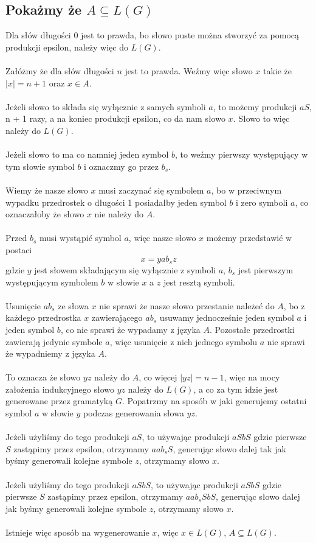 \documentclass{article}
\begin{document}
\subsection*{Pokażmy że $A \subseteq L(G)$}
Dla słów długości 0 jest to prawda, bo słowo puste można stworzyć za pomocą produkcji epsilon, należy więc do $L(G)$.\\
\\
Załóżmy że dla słów długości $n$ jest to prawda. Weźmy więc słowo $x$ takie że $|x| = n + 1$ oraz $x \in A$.\\
\\
Jeżeli słowo to składa się wyłącznie z samych symboli $a$, to możemy produkcji $aS$, n + 1 razy, a na koniec produkcji epsilon, co da nam słowo $x$. Słowo to więc należy do $L(G)$.\\
\\ 
Jeżeli słowo to ma co namniej jeden symbol $b$, to weźmy pierwszy występujący w tym słowie symbol $b$ i oznaczmy go przez $b_s$.\\
\\
Wiemy że nasze słowo $x$ musi zaczynać się symbolem $a$, bo w przeciwnym wypadku przedrostek o długości 1 posiadałby jeden symbol $b$ i zero symboli $a$, co oznaczałoby że słowo $x$ nie należy do $A$.\\
\\
Przed $b_s$ musi wystąpić symbol $a$, więc nasze słowo $x$ możemy przedstawić w postaci
\[
    x = yab_sz
\]
gdzie $y$ jest słowem składającym się wyłącznie z symboli $a$, $b_s$ jest pierwszym występującym symbolem $b$ w słowie $x$ a $z$ jest resztą symboli.\\
\\
Usunięcie $ab_s$ ze słowa $x$ nie sprawi że nasze słowo przestanie należeć do $A$, bo z każdego przedrostka $x$ zawierającego $ab_s$ usuwamy jednocześnie jeden symbol $a$ i jeden symbol $b$, co nie sprawi że wypadamy z języka $A$. Pozostałe przedrostki zawierają jedynie symbole $a$, więc usunięcie z nich jednego symbolu $a$ nie sprawi że wypadniemy z języka $A$.\\
\\
To oznacza że słowo $yz$ należy do $A$, co więcej $|yz| = n - 1$, więc na mocy założenia indukcyjnego słowo $yz$ należy do $L(G)$, a co za tym idzie jest generowane przez gramatyką $G$. Popatrzmy na sposób w jaki generujemy ostatni symbol $a$ w słowie $y$ podczas generowania słowa $yz$.\\
\\
Jeżeli użyliśmy do tego produkcji $aS$, to używając produkcji $aSbS$ gdzie pierwsze $S$ zastąpimy przez epsilon, otrzymamy $aab_sS$, generując słowo dalej tak jak byśmy generowali kolejne symbole $z$, otrzymamy słowo $x$.\\
\\
Jeżeli użyliśmy do tego produkcji $aSbS$, to używając produkcji $aSbS$ gdzie pierwsze $S$ zastąpimy przez epsilon, otrzymamy $aab_sSbS$, generując słowo dalej jak byśmy generowali kolejne symbole $z$, otrzymamy słowo $x$.\\
\\
Istnieje więc sposób na wygenerowanie $x$, więc $x \in L(G)$, $A \subseteq L(G)$. \\
\textbf{}
\end{document}
